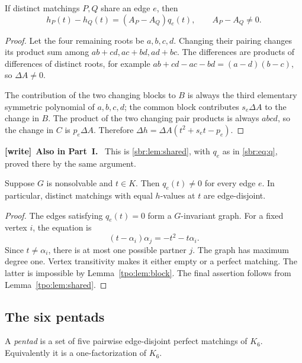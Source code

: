 \documentclass[11pt,letterpaper]{article}
\numberwithin{equation}{section}
\theoremstyle{definition}
\theoremstyle{remark}
\newenvironment{writenote}[1][]{\par\smallskip\begingroup\small
 \noindent\textbf{[write]}\if\relax\detokenize{#1}\relax\else~\textbf{#1.}\fi\ }%
 {\par\endgroup\smallskip}
\begin{document}
\begin{lemma}
\label{tpo:lem:shared}
If distinct matchings $P,Q$ share an edge $e$, then
\begin{equation}
 h_P(t)-h_Q(t)=(A_P-A_Q)q_e(t),\qquad A_P-A_Q\ne0.
 \label{tpo:eq:shared}
\end{equation}
\end{lemma}
\begin{proof}
Let the four remaining roots be $a,b,c,d$. Changing their pairing changes
its product sum among $ab+cd,ac+bd,ad+bc$. The differences are products of
differences of distinct roots, for example
$ab+cd-ac-bd=(a-d)(b-c)$, so $\Delta A\ne0$.

The contribution of the two changing blocks to $B$ is always the third
elementary symmetric polynomial of $a,b,c,d$; the common block contributes
$s_e\Delta A$ to the change in $B$. The product of the two changing pair
products is always $abcd$, so the change in $C$ is $p_e\Delta A$. Therefore
$\Delta h=\Delta A(t^2+s_et-p_e)$.
\end{proof}

\begin{writenote}[Also in Part~I]
This is \cref{sbr:lem:shared}, with $q_e$ as in \eqref{sbr:eq:q}, proved
there by the same argument.
\end{writenote}

\begin{lemma}
\label{tpo:lem:disjoint}
Suppose $G$ is nonsolvable and $t\in K$. Then $q_e(t)\ne0$ for every edge
$e$. In particular, distinct matchings with equal $h$-values at $t$ are
edge-disjoint.
\end{lemma}
\begin{proof}
The edges satisfying $q_e(t)=0$ form a $G$-invariant graph. For a fixed vertex
$i$, the equation is
\[
 (t-\alpha_i)\alpha_j=-t^2-t\alpha_i.
\]
Since $t\ne\alpha_i$, there is at most one possible partner $j$. The graph
has maximum degree one. Vertex transitivity makes it either empty or a
perfect matching. The latter is impossible by Lemma~\ref{tpo:lem:block}.
The final assertion follows from Lemma~\ref{tpo:lem:shared}.
\end{proof}

\subsection{The six pentads}
\begin{definition}
A \emph{pentad} is a set of five pairwise edge-disjoint perfect matchings of
$K_6$. Equivalently it is a one-factorization of $K_6$.
\end{definition}
\end{document}
